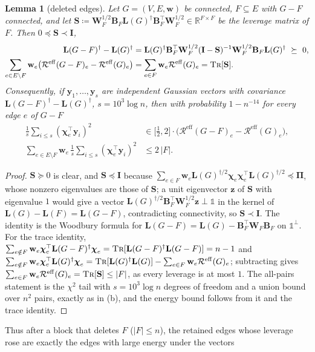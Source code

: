 \documentclass[11pt]{article}
\newtheorem{lemma}[theorem]{Lemma}
\theoremstyle{remark}
\newcommand{\BB}{\mathbf B}
\newcommand{\cchi}{{\boldsymbol\chi}}
\newcommand{\II}{\mathbf I}
\newcommand{\LL}{\mathbf L}
\newcommand{\PPi}{{\boldsymbol\Pi}}
\newcommand{\SSS}{\mathbf S}
\newcommand{\ww}{\mathbf w}
\newcommand{\WW}{\mathbf W}
\newcommand{\yy}{\mathbf y}
\newcommand{\zz}{\mathbf z}
\newcommand{\R}{\mathbb R}
\newcommand{\Rcal}{\mathcal{R}}
\newcommand{\Reff}{\Rcal^{\mathrm{eff}}}
\newcommand{\defeq}{\coloneqq}
\newcommand{\oone}{\mathds{1}}
\newcommand{\tr}{\textsc{Tr}}
\begin{document}
\begin{lemma}[deleted edges]\label{lem:woodbury}
Let $G=(V,E,\ww)$ be connected, $F\subseteq E$ with $G-F$ connected, and let
$\SSS\defeq\WW_F^{1/2}\BB_F\LL(G)^{\dag}\BB_F^{\top}\WW_F^{1/2}\in\R^{F\times F}$ be
the leverage matrix of $F$.
Then $0\preceq\SSS\prec\II$,
\begin{align*}
\LL(G-F)^{\dag}-\LL(G)^{\dag}
&=\LL(G)^{\dag}\BB_F^{\top}\WW_F^{1/2}(\II-\SSS)^{-1}\WW_F^{1/2}\BB_F\LL(G)^{\dag}
\ \succeq\ 0,\\
\sum_{e\in E\setminus F}\ww_e\bigl(\Reff(G-F)_e-\Reff(G)_e\bigr)
&=\sum_{e\in F}\ww_e\Reff(G)_e
=\tr[\SSS] .
\end{align*}
Consequently, if $\yy_1,\dots,\yy_{s}$ are independent Gaussian vectors with
covariance $\LL(G-F)^{\dag}-\LL(G)^{\dag}$, $s=10^{3}\log n$, then with
probability $1-n^{-14}$ for every edge $e$ of $G-F$
\begin{align*}
\frac1{s}\sum_{i\le s}(\cchi_e^{\top}\yy_i)^{2}
&\in\bigl[\tfrac12,2\bigr]\cdot\bigl(\Reff(G-F)_e-\Reff(G)_e\bigr),\\
\sum_{e\in E\setminus F}\ww_e\,\frac1s\sum_{i\le s}(\cchi_e^{\top}\yy_i)^{2}
&\le2\,|F| .
\end{align*}
\end{lemma}
\begin{proof}
$\SSS\succeq0$ is clear, and $\SSS\preceq\II$ because
$\sum_{e\in F}\ww_e\LL(G)^{\dag/2}\cchi_e\cchi_e^{\top}\LL(G)^{\dag/2}\preceq\PPi$,
whose nonzero eigenvalues are those of $\SSS$; a unit eigenvector $\zz$ of
$\SSS$ with eigenvalue $1$ would give a vector
$\LL(G)^{\dag/2}\BB_F^{\top}\WW_F^{1/2}\zz\perp\oone$ in the kernel of
$\LL(G)-\LL(F)=\LL(G-F)$, contradicting connectivity, so $\SSS\prec\II$.
The identity is the Woodbury formula for
$\LL(G-F)=\LL(G)-\BB_F^{\top}\WW_F\BB_F$ on $\oone^{\perp}$.
For the trace identity,
$\sum_{e\notin F}\ww_e\cchi_e^{\top}\LL(G-F)^{\dag}\cchi_e=\tr[\LL(G-F)^{\dag}\LL(G-F)]=n-1$
and
$\sum_{e\notin F}\ww_e\cchi_e^{\top}\LL(G)^{\dag}\cchi_e=\tr[\LL(G)^{\dag}\LL(G)]-\sum_{e\in F}\ww_e\Reff(G)_e$;
subtracting gives $\sum_{e\in F}\ww_e\Reff(G)_e=\tr[\SSS]\le|F|$, as every
leverage is at most $1$.
The all-pairs statement is the $\chi^{2}$ tail with $s=10^{3}\log n$ degrees
of freedom and a union bound over $n^{2}$ pairs, exactly as in
(b), and the energy bound follows from it and the trace
identity.
\end{proof}
Thus after a block that deletes $F$ ($|F|\le n$), the retained edges whose
leverage rose are exactly the edges with large energy under the vectors
\end{document}
